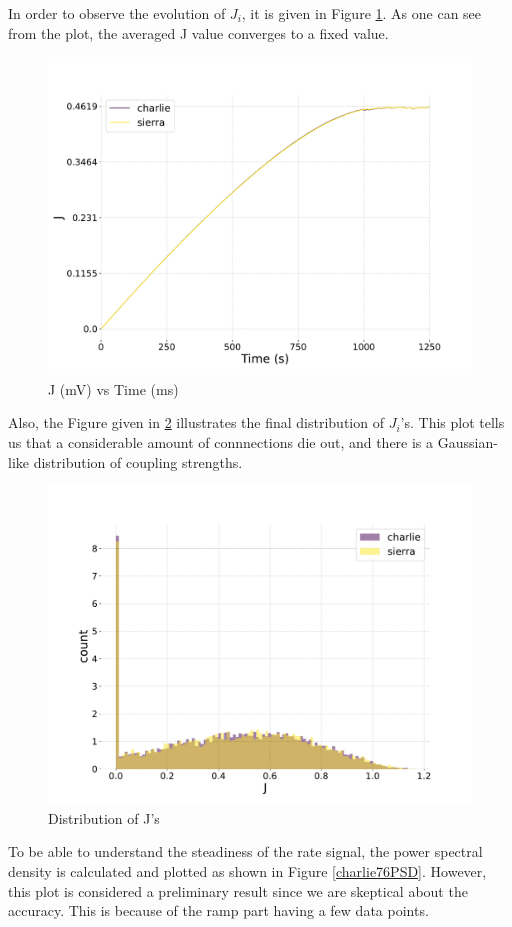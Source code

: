 \documentclass[a4paper,12pt]{article}
\begin{document}
In order to observe the evolution of $J_i$, it is given in Figure \ref{charlie76alphavstime}. As one can see from the plot, the averaged J value converges to a fixed value. 
\begin{figure}[H] 
    \centering
    \includegraphics[width=0.8\linewidth]{nu_ext_76alpha_over_time_homeostasis.pdf}
    \caption{ J (mV) vs Time (ms)}
    \label{charlie76alphavstime}
\end{figure}
Also, the Figure given in \ref{charlie76histogram} illustrates the final distribution of $J_i$'s. This plot tells us that a considerable amount of connnections die out, and there is a Gaussian-like distribution of coupling strengths.
\begin{figure}[H] 
    \centering
    \includegraphics[width=0.8\linewidth]{nu_ext_76j_dist.pdf}
    \caption{Distribution of J's}
    \label{charlie76histogram}
\end{figure}
To be able to understand the steadiness of the rate signal, the power spectral density is calculated and plotted as shown in Figure \ref{charlie76PSD}. However, this plot is considered a preliminary result since we are skeptical about the accuracy. This is because of the ramp part having a few data points.  
\end{document}
